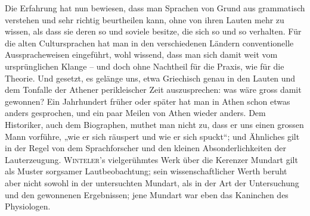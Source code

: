 Die Erfahrung hat nun bewiesen, dass man Sprachen von Grund aus grammatisch verstehen und sehr richtig beurtheilen kann, ohne von ihren Lauten mehr zu wissen, als dass sie deren  so und soviele besitze, die sich  so und so  verhalten. Für die alten Cultursprachen hat man in den verschiedenen Ländern conventionelle Ausspracheweisen eingeführt, wohl wissend, dass man sich damit weit vom ursprünglichen Klange  – und doch ohne Nachtheil für die Praxis, wie für die Theorie. Und gesetzt, es gelänge uns, etwa Griechisch genau in den Lauten und dem Tonfalle der Athener perikleischer Zeit auszusprechen: was wäre gross damit gewonnen? Ein Jahrhundert früher oder später hat man in Athen schon etwas anders gesprochen, und ein paar Meilen von Athen wieder anders. Dem Historiker, auch dem Biographen, muthet man nicht zu, dass er uns einen grossen Mann vorführe, „wie er sich räuspert und wie er sich spuckt“; \label{fp.33} und Ähnliches gilt in der Regel von dem Sprachforscher und den kleinen Absonderlichkeiten der Lauterzeugung. \textsc{Winteler}’s vielgerühmtes Werk über die Kerenzer Mundart gilt als Muster sorgsamer Lautbeobachtung; sein wissenschaftlicher Werth beruht aber nicht sowohl in der untersuchten Mundart, als in der Art der Untersuchung und den gewonnenen Ergebnissen; jene Mundart war eben das Kaninchen des Physiologen.

